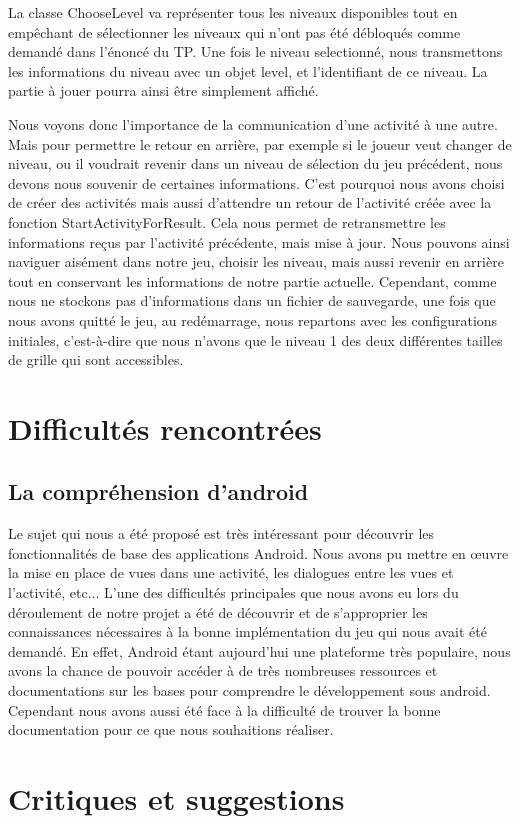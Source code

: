 \documentclass[12pt, a4paper]{article}%
\begin{document}
La classe ChooseLevel va représenter tous les niveaux disponibles tout en empêchant de sélectionner les niveaux qui n'ont pas été débloqués comme demandé dans l'énoncé du TP. Une fois le niveau selectionné, nous transmettons les informations du niveau avec un objet level, et l'identifiant de ce niveau. La partie à jouer pourra ainsi être simplement affiché.

Nous voyons donc l'importance de la communication d'une activité à une autre. Mais pour permettre le retour en arrière, par exemple si le joueur veut changer de niveau, ou il voudrait revenir dans un niveau de sélection du jeu précédent, nous devons nous souvenir de certaines informations. C'est pourquoi nous avons choisi de créer des activités mais aussi d'attendre un retour de l'activité créée avec la fonction StartActivityForResult. Cela nous permet de retransmettre les informations reçus par l'activité précédente, mais mise à jour. Nous pouvons ainsi naviguer aisément dans notre jeu, choisir les niveau, mais aussi revenir en arrière tout en conservant les informations de notre partie actuelle. Cependant, comme nous ne stockons pas d'informations dans un fichier de sauvegarde, une fois que nous avons quitté le jeu, au redémarrage, nous repartons avec les configurations initiales, c'est-à-dire que nous n'avons que le niveau 1 des deux différentes tailles de grille qui sont accessibles.  

\section{Difficultés rencontrées}
  \subsection{La compréhension d'android}
  Le sujet qui nous a été proposé est très intéressant pour découvrir les fonctionnalités de base des applications Android. Nous avons pu mettre en œuvre la mise en place de vues dans une activité, les dialogues entre les vues et l'activité, etc...
L'une des difficultés principales que nous avons eu lors du déroulement de notre projet a été de découvrir et de s'approprier les connaissances nécessaires à la bonne implémentation du jeu qui nous avait été demandé. En effet, Android étant aujourd'hui une plateforme très populaire, nous avons la chance de pouvoir accéder à de très nombreuses ressources et documentations sur les bases pour comprendre le développement sous android. Cependant nous avons aussi été face à la difficulté de trouver la bonne documentation pour ce que nous souhaitions réaliser. 
\section{Critiques et suggestions}
\end{document}
